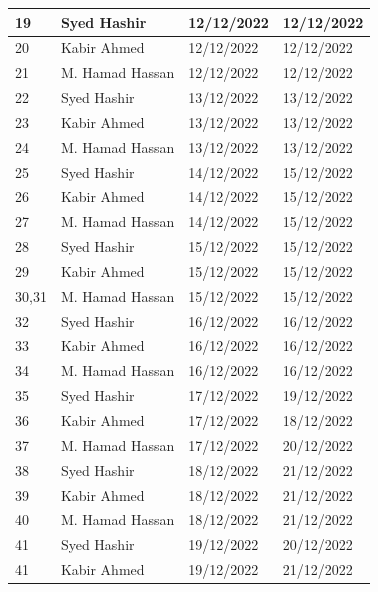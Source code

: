 \documentclass[12pt,a4paper]{article}
\begin{document}
\begin{longtable}{| p{1cm}|p{4cm}|p{2cm}|p{3cm}|}
19& Syed Hashir 	&12/12/2022 &12/12/2022  \\ \hline
20& Kabir Ahmed		&12/12/2022 &12/12/2022  \\ \hline
21& M. Hamad Hassan&12/12/2022 &12/12/2022 \\ \hline

22& Syed Hashir 	&13/12/2022 &13/12/2022   \\ \hline
23& Kabir Ahmed		&13/12/2022   &13/12/2022\\ \hline
24& M. Hamad Hassan&13/12/2022 &13/12/2022 \\ \hline

25& Syed Hashir 	&14/12/2022  &15/12/2022 \\ \hline
26& Kabir Ahmed		&14/12/2022  &15/12/2022 \\ \hline
27& M. Hamad Hassan&14/12/2022  &15/12/2022\\ \hline


28& Syed Hashir 	&15/12/2022  &15/12/2022 \\ \hline
29& Kabir Ahmed		&15/12/2022  &15/12/2022 \\ \hline
30,31 & M. Hamad Hassan&15/12/2022  &15/12/2022\\ \hline

32& Syed Hashir		&16/12/2022  &16/12/2022 \\ \hline
33& Kabir Ahmed		&16/12/2022  &16/12/2022 \\ \hline
34& M. Hamad Hassan		&16/12/2022  &16/12/2022 \\ \hline

35& Syed Hashir		&17/12/2022  &19/12/2022 \\ \hline
36& Kabir Ahmed		&17/12/2022  &18/12/2022 \\ \hline
37& M. Hamad Hassan		&17/12/2022  &20/12/2022 \\ \hline

38& Syed Hashir		&18/12/2022  &21/12/2022 \\ \hline
39& Kabir Ahmed		&18/12/2022  &21/12/2022 \\ \hline
40& M. Hamad Hassan		&18/12/2022  &21/12/2022 \\ \hline

41& Syed Hashir		&19/12/2022  &20/12/2022 \\ \hline
41& Kabir Ahmed		&19/12/2022  &21/12/2022 \\ \hline
\end{longtable}

\end{document}

